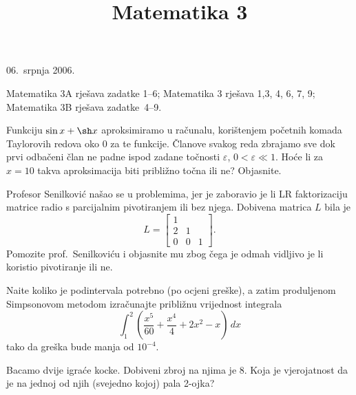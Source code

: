 \documentclass{ispit}
\title{Matematika 3}
\begin{document}
\begin{ispit}{06.~srpnja 2006.}

    \begin{napomena}
    Matematika 3A rje\v{s}ava zadatke 1--6; Matematika 3  rje\v{s}ava 1,3, 4, 6, 7, 9;
    Matematika 3B rje\v{s}ava zadatke~4--9.
    \end{napomena}

    \bigskip



\begin{zadatak}
	Funkciju $\sin x + \sh x$ aproksimiramo u ra\v{c}unalu,
	kori\v{s}tenjem po\v{c}etnih komada Taylorovih redova oko $0$ za te
	funkcije. \v{C}lanove svakog reda zbrajamo sve dok prvi odba\v{c}eni
	\v{c}lan ne padne ispod zadane to\v{c}nosti $\varepsilon$,
	$0 < \varepsilon \ll 1$. Ho\'{c}e li za $x = 10$ takva aproksimacija
	biti pribli\v{z}no to\v{c}na ili ne? Objasnite.
\end{zadatak}

\begin{zadatak}
	Profesor Senilkovi\'{c} na\v{s}ao se u problemima, jer je
	zaboravio je li LR faktorizaciju matrice radio s parcijalnim
	pivotiranjem ili bez njega. Dobivena matrica $L$ bila je
	\begin{displaymath}
		L = \left[
			\begin{array}{rrr}
			 1 &   &   \\
			 2 & 1 &   \\
			 0 & 0 & 1
			\end{array}
			\right].
	\end{displaymath}
	Pomozite prof.\ Senilkovi\'{c}u i objasnite mu zbog \v{c}ega je
	odmah vidljivo je li koristio pivotiranje ili ne. 
\end{zadatak}

\begin{zadatak}
	Na\dj ite koliko je podintervala potrebno (po ocjeni gre\v{s}ke),
	a zatim produljenom Simpsonovom metodom izra\v{c}unajte
	pribli\v{z}nu vrijednost integrala
	\begin{displaymath}
		\int_1^2 \left( \frac{x^5}{60} + \frac{x^4}{4} + 2x^2
				- x \right) \, dx
	\end{displaymath}
	tako da gre\v{s}ka bude manja od $10^{-4}$.
\end{zadatak}

 
\begin{zadatak}
Bacamo dvije igra\'ce kocke. Dobiveni zbroj na njima je 8. Koja je vjerojatnost da je na jednoj od njih (svejedno kojoj) pala 2-ojka?
\end{zadatak}


\end{ispit}
\end{document}
